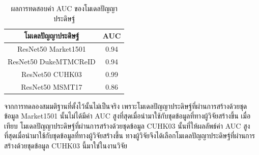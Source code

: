 \clearpage
\begin{table}[!ht]
    \centering
    \begin{tabular}{|c|c|}
            \hline
            {โมเดลปัญญาประดิษฐ์}&{AUC}											\\
            \hline
            ResNet50 Market1501	 		& 0.94								\\
            ResNet50 DukeMTMCReID		& 0.94								\\
            ResNet50 CUHK03				& 0.99								\\
            ResNet50 MSMT17				& 0.86								\\
        \hline
    \end{tabular}
    \caption{ผลการทดสอบค่า AUC ของโมเดลปัญญาประดิษฐ์}
    \label{tab: AUC of model ReID}
\end{table}

จากการทดลองสมมติฐานที่ตั้งไว้นั้นไม่เป็นจริง เพราะโมเดลปัญญาประดิษฐ์ที่ผ่านการสร้างด้วยชุดข้อมูล Market1501 นั้นไม่ได้มีค่า AUC สูงที่สุดเมื่อนำมาใช้กับชุดข้อมูลที่ทางผู้วิจัยสร้างขึ้น เมื่อเทียบ โมเดลปัญญาประดิษฐ์ที่ผ่านการสร้างด้วยชุดข้อมูล CUHK03 นั้นที่ให้ผลลัพธ์ค่า AUC สูงที่สุดเมื่อนำมาใช้กับชุดข้อมูลที่ทางผู้วิจัยสร้างขึ้น ทางผู้วิจัยจึงได้เลือกโมเดลปัญญาประดิษฐ์ที่ผ่านการสร้างด้วยชุดข้อมูล CUHK03 นี้มาใช่ในงานวิจัย